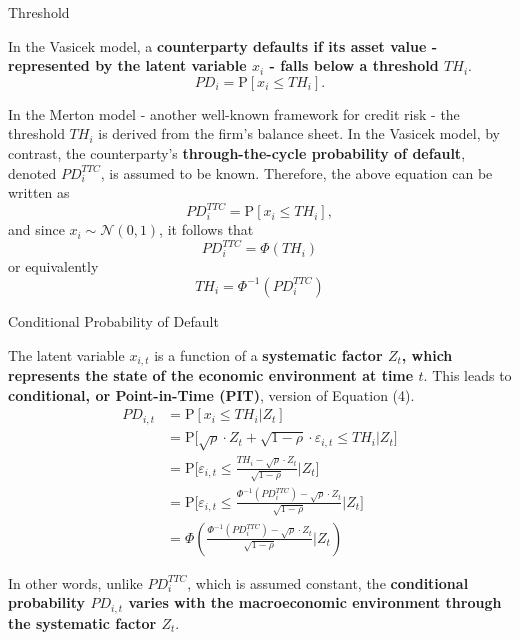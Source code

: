 \documentclass{beamer}
\begin{document}
\begin{frame}{Threshold}
\justifying
\small

In the Vasicek model, a \textbf{counterparty defaults if its asset value - represented by the latent variable $x_i$ - falls below a threshold $TH_i$}.
\begin{equation*}
PD_i = \mathrm{P}[x_i \le TH_i].
\end{equation*}

\medskip

In the Merton model - another well-known framework for credit risk - the threshold $TH_i$ is derived from the firm's balance sheet. 
In the Vasicek model, by contrast, the counterparty's \textbf{through-the-cycle probability of default}, denoted $PD_i^{TTC}$, is assumed to be known. Therefore, the above equation can be written as
\begin{equation}
PD_i^{TTC} = \mathrm{P}[x_i \le TH_i],
\end{equation}
and since $x_i \sim \mathcal{N}(0,1)$, it follows that
\begin{equation*}
PD_i^{TTC} = \Phi(TH_i)
\end{equation*}
or equivalently
\begin{equation}
TH_i = \Phi^{-1}(PD_i^{TTC})
\end{equation}

\end{frame}


\begin{frame}{Conditional Probability of Default}
\justifying
\small

The latent variable $x_{i, t}$ is a function of a \textbf{systematic factor $Z_t$, which represents the state of the economic environment at time $t$}. This leads to \textbf{conditional, or Point-in-Time (PIT)}, version of Equation (4).
{\tiny
\begin{align}
PD_{i, t} &= \mathrm{P}[x_i \le TH_i | Z_t] \nonumber \\
&= \mathrm{P}\Bigg[\sqrt{\rho} \cdot Z_t + \sqrt{1 - \rho} \cdot \varepsilon_{i,t} \le TH_i | Z_t \Bigg] \nonumber \\
&= \mathrm{P}\Bigg[\varepsilon_{i,t} \le \frac{TH_i - \sqrt{\rho} \cdot Z_t}{\sqrt{1 - \rho}} | Z_t\Bigg] \nonumber \\
&= \mathrm{P}\Bigg[\varepsilon_{i,t} \le \frac{\Phi^{-1}(PD_i^{TTC}) - \sqrt{\rho} \cdot Z_t}{\sqrt{1 - \rho}} | Z_t\Bigg] \nonumber \\
&= \Phi\left(\frac{\Phi^{-1}(PD_i^{TTC}) - \sqrt{\rho} \cdot Z_t}{\sqrt{1 - \rho}} | Z_t \right)
\end{align}
}

\medskip

In other words, unlike $PD_i^{TTC}$, which is assumed constant, the \textbf{conditional probability $PD_{i,t}$ varies with the macroeconomic environment through the systematic factor $Z_t$}.

\end{frame}
\end{document}
